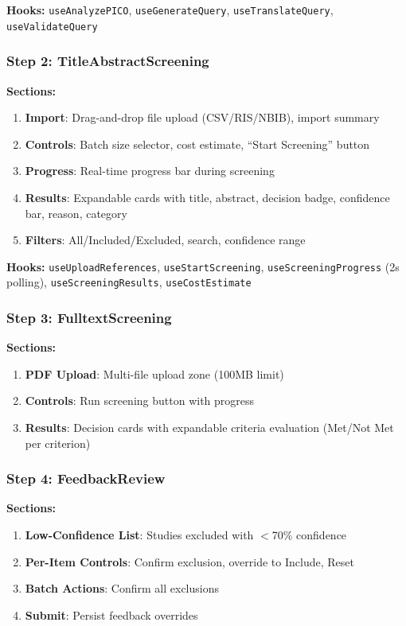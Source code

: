 \documentclass[11pt,a4paper]{article}
\begin{document}
\textbf{Hooks:} \texttt{useAnalyzePICO}, \texttt{useGenerateQuery}, \texttt{useTranslateQuery}, \texttt{useValidateQuery}

\subsubsection{Step 2: TitleAbstractScreening}

\textbf{Sections:}
\begin{enumerate}[nosep]
  \item \textbf{Import}: Drag-and-drop file upload (CSV/RIS/NBIB), import summary
  \item \textbf{Controls}: Batch size selector, cost estimate, ``Start Screening'' button
  \item \textbf{Progress}: Real-time progress bar during screening
  \item \textbf{Results}: Expandable cards with title, abstract, decision badge, confidence bar, reason, category
  \item \textbf{Filters}: All/Included/Excluded, search, confidence range
\end{enumerate}

\textbf{Hooks:} \texttt{useUploadReferences}, \texttt{useStartScreening}, \texttt{useScreeningProgress} (2s polling), \texttt{useScreeningResults}, \texttt{useCostEstimate}

\subsubsection{Step 3: FulltextScreening}

\textbf{Sections:}
\begin{enumerate}[nosep]
  \item \textbf{PDF Upload}: Multi-file upload zone (100MB limit)
  \item \textbf{Controls}: Run screening button with progress
  \item \textbf{Results}: Decision cards with expandable criteria evaluation (Met/Not Met per criterion)
\end{enumerate}

\subsubsection{Step 4: FeedbackReview}

\textbf{Sections:}
\begin{enumerate}[nosep]
  \item \textbf{Low-Confidence List}: Studies excluded with $<$70\% confidence
  \item \textbf{Per-Item Controls}: Confirm exclusion, override to Include, Reset
  \item \textbf{Batch Actions}: Confirm all exclusions
  \item \textbf{Submit}: Persist feedback overrides
\end{enumerate}
\end{document}
